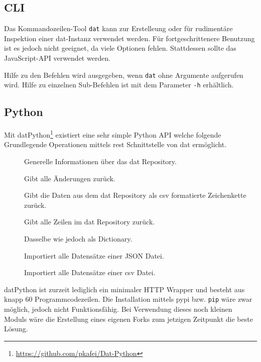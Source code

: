 \subsection{CLI}

Das Kommandozeilen-Tool \texttt{dat} kann zur Erstelleung oder für rudimentäre Inspektion einer dat-Instanz verwendet werden. Für fortgeschrittenere Benutzung ist es jedoch nicht geeignet, da viele Optionen fehlen. Stattdessen sollte das JavaScript-API verwendet werden.

Hilfe zu den Befehlen wird ausgegeben, wenn \texttt{dat} ohne Argumente aufgerufen wird. Hilfe zu einzelnen Sub-Befehlen ist mit dem Parameter \texttt{-h} erhältlich.

\subsection{Python}

Mit datPython\footnote{\url{https://github.com/pkafei/Dat-Python}} existiert eine sehr simple Python API welche folgende Grundlegende Operationen mittels \gls{rest} Schnittstelle von \gls{dat} ermöglicht.

\begin{description}
	\item[] Generelle Informationen über das \gls{dat} Repository.
	\item[] Gibt alle Änderungen zurück.
	\item[] Gibt die Daten aus dem dat Repository als \gls{csv} formatierte Zeichenkette zurück.
	\item[] Gibt alle Zeilen im dat Repository zurück.
	\item[] Dasselbe wie  jedoch als Dictionary.
	\item[] Importiert alle Datensätze einer JSON Datei.
	\item[] Importiert alle Datensätze einer \gls{csv} Datei.
\end{description}

datPython ist zurzeit lediglich ein minimaler HTTP Wrapper und besteht aus knapp 60 Programmcodezeilen. Die Installation mittels \gls{pypi} bzw. \texttt{pip} wäre zwar möglich, jedoch nicht Funktionsfähig. Bei Verwendung dieses noch kleinen Moduls wäre die Erstellung eines eigenen Forks zum jetzigen Zeitpunkt die beste Lösung.

